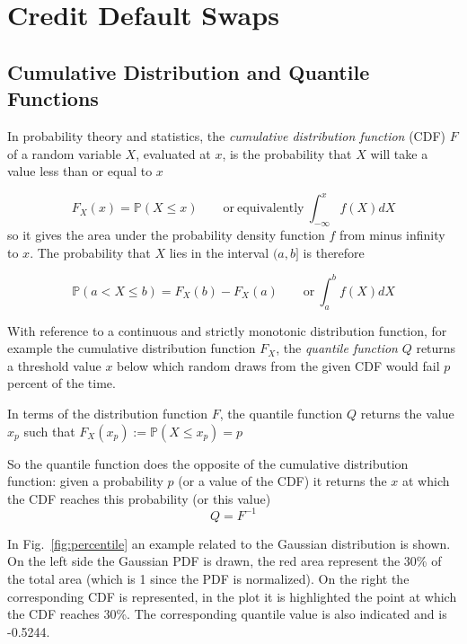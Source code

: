 \chapter{Credit Default Swaps}\label{credit_default_swaps}

\section{Cumulative Distribution and Quantile Functions}\label{quantile-function}

In probability theory and statistics, the \emph{cumulative distribution function} (CDF) \(F\) of a random variable \(X\), evaluated at \(x\), is the probability that \(X\) will take a value less than or equal to \(x\)

\[F_X(x) = \mathbb{P}(X \le x)\qquad\mathrm{or~equivalently}~\int_{-\infty}^{x}{f(X)dX}\]
so it gives the area under the probability density function \(f\) from
minus infinity to \(x\).
The probability that \(X\) lies in the interval \((a,b]\) is therefore

\[\mathbb{P}(a\lt X \le b)=F_{X}(b)-F_{X}(a)\qquad\mathrm{or}~\int_a^b{f(X)dX}\]

With reference to a continuous and strictly monotonic distribution
function, for example the cumulative distribution function \(F_X\), the
\emph{quantile function} \(Q\) returns a threshold value \(x\) below
which random draws from the given CDF would fail \(p\) percent of the
time.

In terms of the distribution function \(F\), the quantile function \(Q\)
returns the value \(x_p\) such that $F_{X}(x_p):=\mathbb{P}(X\le x_p)=p$

So the quantile function does the opposite of the cumulative
distribution function: given a probability \(p\) (or a value of the CDF)
it returns the \(x\) at which the CDF reaches this probability (or this
value) \[Q=F^{-1}\]

In Fig.~\ref{fig:percentile} an example related to the
Gaussian distribution is shown. On the left side the Gaussian PDF is drawn,
the red area represent the 30\% of the total area (which is 1 since the
PDF is normalized). On the right the corresponding CDF is represented,
in the plot it is highlighted the point at which the CDF reaches
30\%. The corresponding quantile value is also indicated and is -0.5244.

